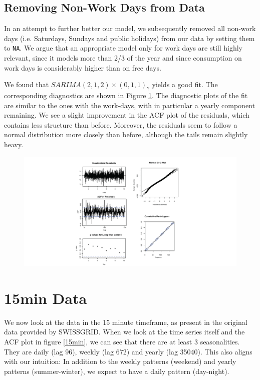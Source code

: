 \documentclass[conference]{IEEEtran}
\begin{document}
\subsection{Removing Non-Work Days from Data}
In an attempt to further better our model, we subsequently removed all non-work days (i.e. Saturdays, Sundays and public holidays) from our data by setting them to \texttt{NA}. We argue that an appropriate model only for work days are still highly relevant, since it models more than 2/3 of the year and since consumption on work days is considerably higher than on free days. 
\par
We found that $SARIMA(2, 1, 2) \times (0, 1, 1)_7$ yields a good fit. The corresponding diagnostics are shown in Figure \ref{daily_nowe}. The diagnostic plots of the fit are similar to the ones with the work-days, with in particular a yearly component remaining. We see a slight improvement in the ACF plot of the residuals, which contains less structure than before. Moreover, the residuals seem to follow a normal distribution more closely than before, although the tails remain slightly heavy.

\begin{figure}[ht]
	\centering
	\includegraphics[width=1\textwidth]{Figs/Fig7.pdf}
	\caption{}
	\label{daily_nowe}
\end{figure}


\section{15min Data}
We now look at the data in the 15 minute timeframe, as present in the original data provided by SWISSGRID. When we look at the time series itself and the ACF plot in figure \ref{15min}, we can see that there are at least 3 seasonalities. They are daily (lag 96), weekly (lag 672) and yearly (lag 35040). This also aligns with our intuition: In addition to the weekly patterns (weekend) and yearly patterns (summer-winter), we expect to have a daily pattern (day-night).
\end{document}

